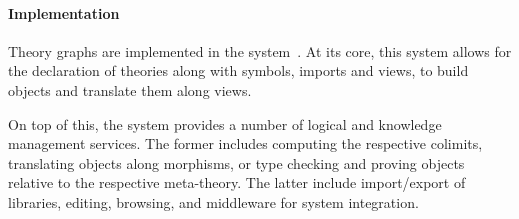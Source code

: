 \paragraph{Implementation}
Theory graphs are implemented in the \MMT system~\cite{Rabe:MAGMS13,uniformal:on}.
At its core, this system allows for the declaration of theories along with symbols, imports and views, to build objects and translate them along views.

On top of this, the \MMT system provides a number of logical and knowledge management services.
The former includes computing the respective colimits, translating objects along morphisms, or type checking and proving objects relative to the respective meta-theory.
The latter include import/export of libraries, editing, browsing, and middleware for system integration.
